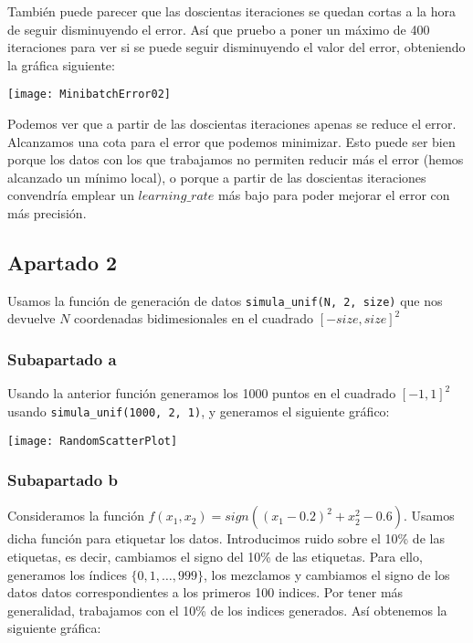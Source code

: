 \documentclass[11pt]{article}
\begin{document}
También puede parecer que las doscientas iteraciones se quedan cortas a la hora de seguir disminuyendo el error. Así que pruebo a poner un máximo de 400 iteraciones para ver si se puede seguir disminuyendo el valor del error, obteniendo la gráfica siguiente:

\texttt{[image: MinibatchError02]}

Podemos ver que a partir de las doscientas iteraciones apenas se reduce el error. Alcanzamos una cota para el error que podemos minimizar. Esto puede ser bien porque los datos con los que trabajamos no permiten reducir más el error (hemos alcanzado un mínimo local), o porque a partir de las doscientas iteraciones convendría emplear un $learning\_rate$ más bajo para poder mejorar el error con más precisión.

\pagebreak

\subsection{Apartado 2}

Usamos la función de generación de datos \lstinline{simula_unif(N, 2, size)} que nos devuelve $N$ coordenadas bidimesionales en el cuadrado $[-size, size]^2$

\subsubsection{Subapartado a}

Usando la anterior función generamos los 1000 puntos en el cuadrado $[-1, 1]^2$ usando \lstinline{simula_unif(1000, 2, 1)}, y generamos el siguiente gráfico:

\texttt{[image: RandomScatterPlot]}

\subsubsection{Subapartado b}

Consideramos la función $f(x_1, x_2) = sign((x_1 - 0.2)^2 + x_2^2 - 0.6)$. Usamos dicha función para etiquetar los datos. Introducimos ruido sobre el 10\% de las etiquetas, es decir, cambiamos el signo del 10\% de las etiquetas. Para ello, generamos los índices $\{0, 1, \ldots, 999\}$, los mezclamos y cambiamos el signo de los datos datos correspondientes a los primeros 100 indices. Por tener más generalidad, trabajamos con el 10\% de los indices generados. Así obtenemos la siguiente gráfica:
\end{document}
